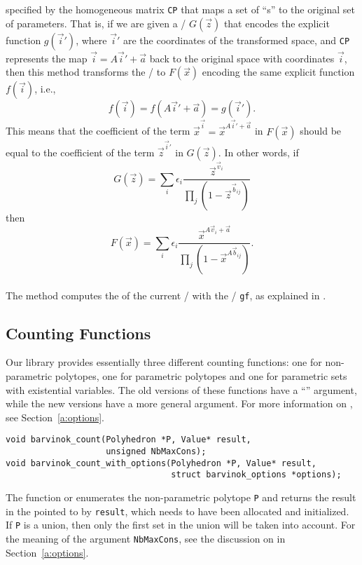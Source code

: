  specified by the homogeneous matrix \verb+CP+
that maps a set of ``s'' 
to the original set of parameters.
That is, if we are given a \rgf/ $G(\vec z)$ that encodes the
explicit function $g(\vec i')$, where $\vec i'$ are the coordinates of
the transformed space, and \verb+CP+ represents the map
$\vec i = A \vec i' + \vec a$ back to the original space with coordinates $\vec i$,
then this method transforms the \rgf/ to $F(\vec x)$ encoding the
same explicit function $f(\vec i)$, i.e., 
$$f(\vec i) = f(A \vec i' + \vec a) = g(\vec i ').$$
This means that the coefficient of the term 
$\vec x^{\vec i} = \vec x^{A \vec i' + \vec a}$ in $F(\vec x)$ should be equal to the
coefficient of the term $\vec z^{\vec i'}$ in $G(\vec z)$.
In other words, if
$$
G(\vec z) =
\sum_i \epsilon_i \frac{\vec z^{\vec v_i}}{\prod_j (1-\vec z^{\vec b_{ij}})}
$$
then
$$
F(\vec x) =
\sum_i \epsilon_i \frac{\vec x^{A \vec v_i + \vec a}}
                       {\prod_j (1-\vec x^{A \vec b_{ij}})}
.
$$
\\
The method  computes the
 of the current \rgf/ with the \rgf/ \verb+gf+,
as explained in .

\subsection{Counting Functions}
\label{a:counting:functions}

Our library provides essentially three different counting functions:
one for non-parametric polytopes, one for parametric polytopes
and one for parametric sets with existential variables.
The old versions of these functions have a ``''
argument, while the new versions have a more general
 argument.
For more information on , see Section~\ref{a:options}.

\begin{verbatim}
void barvinok_count(Polyhedron *P, Value* result, 
                    unsigned NbMaxCons);
void barvinok_count_with_options(Polyhedron *P, Value* result,
                                 struct barvinok_options *options);
\end{verbatim}
The function  or
 enumerates the non-parametric
polytope \verb+P+ and returns the result in the 
pointed to by \verb+result+, which needs to have been allocated
and initialized.
If \verb+P+ is a union, then only the first set in the union will
be taken into account.
For the meaning of the argument \verb+NbMaxCons+, see
the discussion on  in Section~\ref{a:options}.

